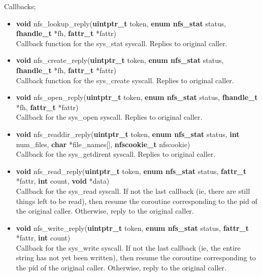 \documentclass[12pt]{article}
\begin{document}
Callbacks;
\begin{itemize}
\item \textbf{void} nfs\_lookup\_reply(\textbf{uintptr\_t} token, \textbf{enum nfs\_stat} status, \textbf{fhandle\_t} *fh, \textbf{fattr\_t} *fattr)\\
Callback function for the sys\_stat syscall. Replies to original caller.
\item \textbf{void} nfs\_create\_reply(\textbf{uintptr\_t} token, \textbf{enum nfs\_stat} status, \textbf{fhandle\_t} *fh, \textbf{fattr\_t} *fattr)\\
Callback function for the sys\_create syscall. Replies to original caller.
\item \textbf{void} nfs\_open\_reply(\textbf{uintptr\_t} token, \textbf{enum nfs\_stat} status, \textbf{fhandle\_t} *fh, \textbf{fattr\_t} *fattr)\\
Callback for the sys\_open syscall. Replies to original caller.
\item \textbf{void} nfs\_readdir\_reply(\textbf{uintptr\_t} token, \textbf{enum nfs\_stat} status, \textbf{int} num\_files, \textbf{char} *file\_names[], \textbf{nfscookie\_t} nfscookie)\\
Callback for the sys\_getdirent syscall. Replies to original caller.
\item \textbf{void} nfs\_read\_reply(\textbf{uintptr\_t} token, \textbf{enum nfs\_stat} status, \textbf{fattr\_t} *fattr, \textbf{int} count, \textbf{void} *data)\\
Callback for the sys\_read syscall. If not the last callback (ie, there are still things left to be read), then resume the coroutine corresponding to the pid of the original caller. Otherwise, reply to the original caller.
\item \textbf{void} nfs\_write\_reply(\textbf{uintptr\_t} token, \textbf{enum nfs\_stat} status, \textbf{fattr\_t} *fattr, \textbf{int} count)\\
Callback for the sys\_write syscall. If not the last callback (ie, the entire string has not yet been written), then resume the coroutine corresponding to the pid of the original caller. Otherwise, reply to the original caller.
\end{itemize}
\end{document}
